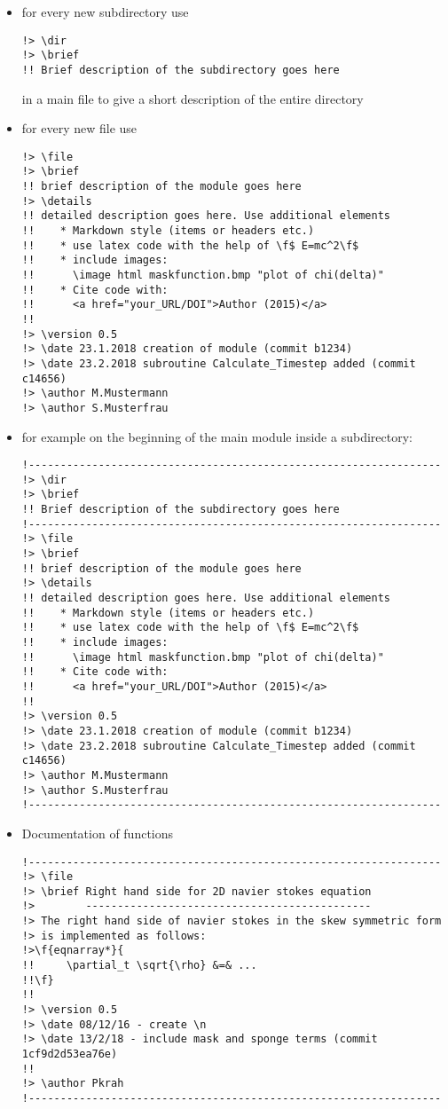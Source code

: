 \documentclass[11pt]{article}
\begin{document}
	\begin{itemize}
		\item for every new subdirectory use 
		\begin{lstlisting}
!> \dir
!> \brief
!! Brief description of the subdirectory goes here
\end{lstlisting}
		in a main file to give a short description of the entire directory

	\item for every new file use 
		\begin{lstlisting}
!> \file
!> \brief
!! brief description of the module goes here
!> \details
!! detailed description goes here. Use additional elements
!!    * Markdown style (items or headers etc.)
!!    * use latex code with the help of \f$ E=mc^2\f$
!!    * include images: 
!!		\image html maskfunction.bmp "plot of chi(delta)"
!!    * Cite code with:
!!		<a href="your_URL/DOI">Author (2015)</a>
!!	
!> \version 0.5
!> \date 23.1.2018 creation of module (commit b1234)
!> \date 23.2.2018 subroutine Calculate_Timestep added (commit c14656)
!> \author M.Mustermann
!> \author S.Musterfrau
\end{lstlisting}
	\item for example on the beginning of the main module inside a subdirectory:
	
\begin{lstlisting}
!-----------------------------------------------------------------
!> \dir
!> \brief
!! Brief description of the subdirectory goes here
!-----------------------------------------------------------------
!> \file
!> \brief
!! brief description of the module goes here
!> \details
!! detailed description goes here. Use additional elements
!!    * Markdown style (items or headers etc.)
!!    * use latex code with the help of \f$ E=mc^2\f$
!!    * include images: 
!!		\image html maskfunction.bmp "plot of chi(delta)"
!!    * Cite code with:
!!		<a href="your_URL/DOI">Author (2015)</a>
!!	
!> \version 0.5
!> \date 23.1.2018 creation of module (commit b1234)
!> \date 23.2.2018 subroutine Calculate_Timestep added (commit c14656)
!> \author M.Mustermann
!> \author S.Musterfrau
!-----------------------------------------------------------------
\end{lstlisting}

	\item Documentation of functions 

\begin{lstlisting}
!-----------------------------------------------------------------
!> \file
!> \brief Right hand side for 2D navier stokes equation
!>        ---------------------------------------------
!> The right hand side of navier stokes in the skew symmetric form 
!> is implemented as follows:
!>\f{eqnarray*}{
!!     \partial_t \sqrt{\rho} &=& ...
!!\f}
!!
!> \version 0.5
!> \date 08/12/16 - create \n
!> \date 13/2/18 - include mask and sponge terms (commit 1cf9d2d53ea76e)
!!
!> \author Pkrah
!-----------------------------------------------------------------



\end{lstlisting}
\end{itemize}
\end{document}
